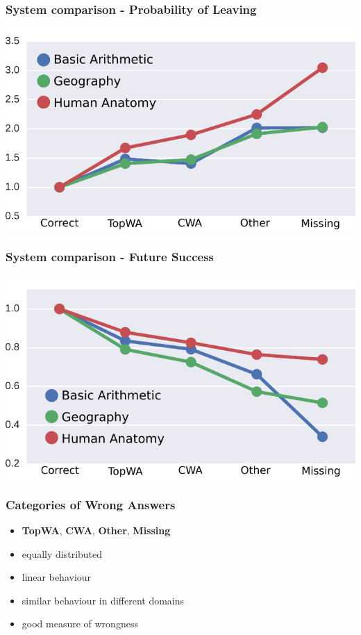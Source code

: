 \documentclass[xcolor=svgnames]{beamer}
\begin{document}
\begin{frame}
    \frametitle{System comparison - Probability of Leaving}
    \centering
    \includegraphics[width=0.8\linewidth]{figures/system-comparison-leaving}
\end{frame}
\begin{frame}
    \frametitle{System comparison - Future Success}
    \centering
    \includegraphics[width=0.8\linewidth]{figures/system-comparison-future-success}
\end{frame}
\begin{frame}
    \frametitle{Categories of Wrong Answers}
    \Large
    \begin{itemize}
        \item \textbf{TopWA}, \textbf{CWA}, \textbf{Other}, \textbf{Missing}
        \item equally distributed
        \item linear behaviour
        \item similar behaviour in different domains
        \item good measure of wrongness
    \end{itemize}
\end{frame}
\end{document}
